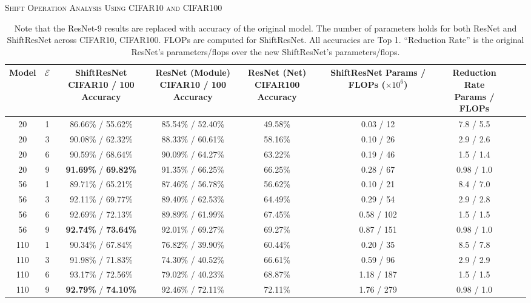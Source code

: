 \documentclass[10pt,twocolumn,letterpaper]{article}
\begin{document}
\begin{table*}
\caption{\textsc{Shift Operation Analysis Using CIFAR10 and CIFAR100}}
\label{tab:cifar10-100}
\vspace{-0.1in}
\begin{tabular}{c | c c c c c c c c}
Model & $\mathcal{E}$ & \thead{ {\normalsize ShiftResNet} \\ CIFAR10 / 100 Accuracy} & \thead{{\normalsize ResNet (Module) }\\ CIFAR10 / 100 Accuracy} &
\thead{{\normalsize ResNet (Net)} \\ CIFAR100 Accuracy} &\thead{{ \normalsize ShiftResNet }\\ Params / FLOPs ($\times10^6$)} & \thead{{\normalsize Reduction Rate} \\ Params / FLOPs}\\
\hline
20 & 1 & 86.66\% / 55.62\% & 85.54\% / 52.40\% & 49.58\% & 0.03 / 12 & 7.8 / 5.5\\
20 & 3 & 90.08\% / 62.32\% & 88.33\% / 60.61\% & 58.16\% & 0.10 / 26 & 2.9 / 2.6\\
20 & 6 & 90.59\% / 68.64\% & 90.09\% / 64.27\% & 63.22\% & 0.19 / 46 & 1.5 / 1.4 \\
20 & 9 & \textbf{91.69\%} / \textbf{69.82\%} & 91.35\% / 66.25\% & 66.25\% & 0.28 / 67 & 0.98 / 1.0 \\
\hline
56 & 1 & 89.71\% / 65.21\% & 87.46\% / 56.78\% & 56.62\% & 0.10 / 21 & 8.4 / 7.0\\
56 & 3 & 92.11\% / 69.77\% & 89.40\% / 62.53\% & 64.49\% & 0.29 / 54 & 2.9 / 2.8\\
56 & 6 & 92.69\% / 72.13\% & 89.89\% / 61.99\% & 67.45\% & 0.58 / 102 & 1.5 / 1.5 \\
56 & 9 & \textbf{92.74\%} / \textbf{73.64\%} & 92.01\% / 69.27\% & 69.27\% & 0.87 / 151 & 0.98 / 1.0 \\
\hline
110 & 1 & 90.34\% / 67.84\% & 76.82\% / 39.90\% & 60.44\% & 0.20 / 35 & 8.5 / 7.8\\
110 & 3 & 91.98\% / 71.83\% & 74.30\% / 40.52\% & 66.61\% & 0.59 / 96 & 2.9 / 2.9\\
110 & 6 & 93.17\% / 72.56\% & 79.02\% / 40.23\% & 68.87\% & 1.18 / 187 & 1.5 / 1.5\\
110 & 9 & \textbf{92.79\%} / \textbf{74.10\%} & 92.46\% / 72.11\% & 72.11\% & 1.76 / 279 & 0.98 / 1.0\\
\hline
\end{tabular}
\caption*{Note that the ResNet-9 results are replaced with accuracy of the original model. The number of parameters holds for both ResNet and ShiftResNet across CIFAR10, CIFAR100. FLOPs are computed for ShiftResNet. All accuracies are Top 1. ``Reduction Rate'' is the original ResNet's parameters/flops over the new ShiftResNet's parameters/flops.}
\vspace{-0.3in}
\end{table*}
\end{document}
